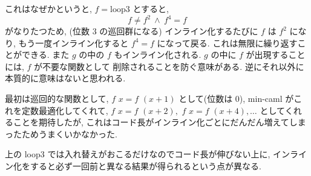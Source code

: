 \documentclass[dvipdfmx]{jsarticle}
\begin{document}
これはなぜかというと, $f = {\mathrm{loop3}}$ とすると,
\[
  f \neq f^2~ \wedge~ f^4 = f
\]
がなりたつため, (位数 3 の巡回群になる)
インライン化するたびに $f$ は $f^2$ になり, もう一度インライン化すると $f^4 = f$ になって戻る.
これは無限に繰り返すことができる.
また $g$ の中の $f$ もインライン化される. $g$ の中に $f$ が出現することには, $f$ が不要な関数として
削除されることを防ぐ意味がある. 逆にそれ以外に本質的に意味はないと思われる.

最初は巡回的な関数として,
$f\,\, x = f \,\,(x + 1)$ として(位数は 0), min-caml がこれを定数最適化してくれて,
$f\,\,x = f\,\,(x + 2), \,\,f\,\,x = f\,\,(x + 4), \dots$ としてくれることを期待したが,
これはコード長がインライン化ごとにだんだん増えてしまったためうまくいかなかった.

上の loop3 では入れ替えがおこるだけなのでコード長が伸びない上に,
インライン化をすると必ず一回前と異なる結果が得られるという点が異なる.
\end{document}
